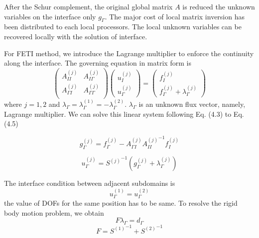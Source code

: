 After the Schur complement, the original global matrix $ A $ is reduced the unknown variables on the interface only $ g_{\Gamma} $. The major cost of local matrix inversion has been distributed to each local processors. The local unknown variables can be recovered locally with the solution of interface.

For FETI method, we introduce the Lagrange multiplier to enforce the continuity along the interface. The governing equation in matrix form is 
\begin{equation}
\begin{pmatrix}
A_{II}^{(j)} & A_{I \Gamma}^{(j)} \\
A_{\Gamma I}^{(j)} & A_{\Gamma \Gamma}^{(j)} \\
\end{pmatrix} \begin{pmatrix}
u_{I}^{(j)} \\ u_{\Gamma}^{(j)} 
\end{pmatrix} = \begin{pmatrix}
f_{I}^{(j)} \\ f_{\Gamma}^{(j)} + \lambda_{\Gamma}^{(j)}
\end{pmatrix}
\end{equation}
where $ j = 1, 2 $ and $ \lambda_{\Gamma} = \lambda_{\Gamma}^{(1)} = - \lambda_{\Gamma}^{(2)} $. $ \lambda_{\Gamma} $ is an unknown flux vector, namely, Lagrange multiplier. We can solve this linear system following Eq. (4.3) to Eq. (4.5)

\begin{equation}
g_{\Gamma}^{(j)} = f_{\Gamma}^{(j)} - A_{\Gamma I}^{(j)} {A_{II}^{(j)}}^{-1} f_{I}^{(j)}
\end{equation}

\begin{equation}
u_{\Gamma}^{(j)} = {S^{(j)}}^{-1} (g_{\Gamma}^{(j)} + \lambda_{\Gamma}^{(j)})
\end{equation}

The interface condition between adjacent subdomains is
\begin{equation}
u_{\Gamma}^{(1)} = u_{\Gamma}^{(2)}
\end{equation}
the value of DOFs for the same position has to be same. To resolve the rigid body motion problem, we obtain
\begin{equation}
F \lambda_{\Gamma} = d_{\Gamma}
\end{equation}
\begin{equation}
F = {S^{(1)}}^{-1} + {S^{(2)}}^{-1}
\end{equation}

